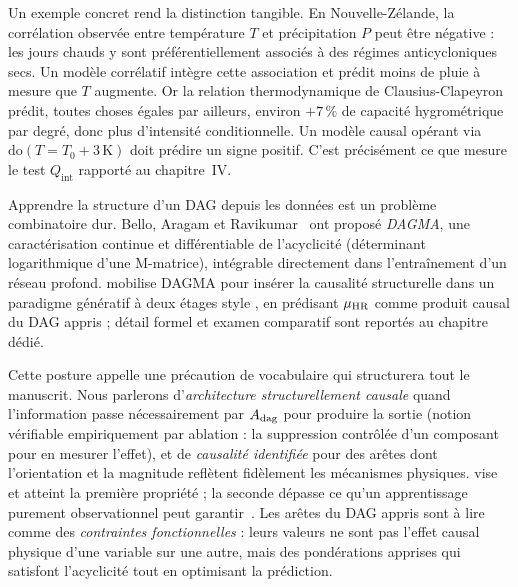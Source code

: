 Un exemple concret rend la distinction tangible. En Nouvelle-Zélande, la corrélation observée entre température $T$ et précipitation $P$ peut être négative : les jours chauds y sont préférentiellement associés à des régimes anticycloniques secs. Un modèle corrélatif intègre cette association et prédit moins de pluie à mesure que $T$ augmente. Or la relation thermodynamique de Clausius-Clapeyron prédit, toutes choses égales par ailleurs, environ $+7\,\%$ de capacité hygrométrique par degré, donc plus d'intensité conditionnelle. Un modèle causal opérant via $\mathrm{do}(T = T_0+3\,\mathrm{K})$ doit prédire un signe positif. C'est précisément ce que mesure le test $Q_{\mathrm{int}}$ rapporté au chapitre~IV.

\label{ssec:learned-dag}
Apprendre la structure d'un DAG depuis les données est un problème combinatoire dur. Bello, Aragam et Ravikumar~\cite{bello_dagma_2022} ont proposé \emph{DAGMA}, une caractérisation continue et différentiable de l'acyclicité (déterminant logarithmique d'une M-matrice), intégrable directement dans l'entraînement d'un réseau profond. \Oracle{} mobilise DAGMA pour insérer la causalité structurelle dans un paradigme génératif à deux étages style \CorrDiff{}, en prédisant $\mu_{\text{HR}}$ comme produit causal du DAG appris ; détail formel et examen comparatif sont reportés au chapitre dédié.

Cette posture appelle une précaution de vocabulaire qui structurera tout le manuscrit. Nous parlerons d'\emph{architecture structurellement causale} quand l'information passe nécessairement par $A_{\mathrm{dag}}$ pour produire la sortie (notion vérifiable empiriquement par ablation : la suppression contrôlée d'un composant pour en mesurer l'effet), et de \emph{causalité identifiée} pour des arêtes dont l'orientation et la magnitude reflètent fidèlement les mécanismes physiques. \Oracle{} vise et atteint la première propriété ; la seconde dépasse ce qu'un apprentissage purement observationnel peut garantir~\cite{pearl_causality_2009,spirtes_2000}. Les arêtes du DAG appris sont à lire comme des \emph{contraintes fonctionnelles} : leurs valeurs ne sont pas l'effet causal physique d'une variable sur une autre, mais des pondérations apprises qui satisfont l'acyclicité tout en optimisant la prédiction.

